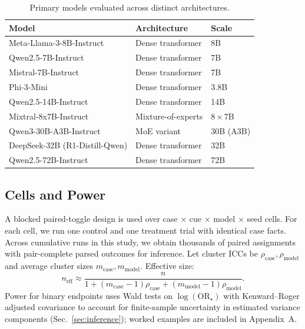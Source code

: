 \documentclass[conference]{IEEEtran}
\begin{document}
\begin{table}[!t]
\caption{Primary models evaluated across distinct architectures.}
\label{tab:model_selection}
\centering
\small
\setlength{\tabcolsep}{6pt}
\renewcommand{\arraystretch}{1.12}
\begin{tabular}{@{}lll@{}}
\toprule
\textbf{Model} & \textbf{Architecture} & \textbf{Scale} \\
\midrule
Meta-Llama-3-8B-Instruct & Dense transformer & 8B \\
Qwen2.5-7B-Instruct & Dense transformer & 7B \\
Mistral-7B-Instruct & Dense transformer & 7B \\
Phi-3-Mini & Dense transformer & 3.8B \\
Qwen2.5-14B-Instruct & Dense transformer & 14B \\
Mixtral-8x7B-Instruct & Mixture-of-experts & $8\times 7$B \\
Qwen3-30B-A3B-Instruct & MoE variant & 30B (A3B) \\
DeepSeek-32B (R1-Distill-Qwen) & Dense transformer & 32B \\
Qwen2.5-72B-Instruct & Dense transformer & 72B \\
\bottomrule
\end{tabular}
\end{table}

\subsection{Cells and Power}
A blocked paired-toggle design is used over case $\times$ cue $\times$ model $\times$ seed cells. For each cell, we run one control and one treatment trial with identical case facts. Across cumulative runs in this study, we obtain thousands of paired assignments with pair-complete parsed outcomes for inference. Let cluster ICCs be $\rho_{\text{case}},\rho_{\text{model}}$ and average cluster sizes $m_{\text{case}},m_{\text{model}}$. Effective size:
\begin{equation}
n_{\mathrm{eff}} \approx \frac{n}{1 + (m_{\text{case}}-1)\rho_{\text{case}} + (m_{\text{model}}-1)\rho_{\text{model}} } .
\label{eq:neff}
\end{equation}
Power for binary endpoints uses Wald tests on $\log(\mathrm{OR}_\star)$ with Kenward--Roger adjusted covariance to account for finite-sample uncertainty in estimated variance components (Sec.~\ref{sec:inference}); worked examples are included in Appendix~A.

\end{document}
